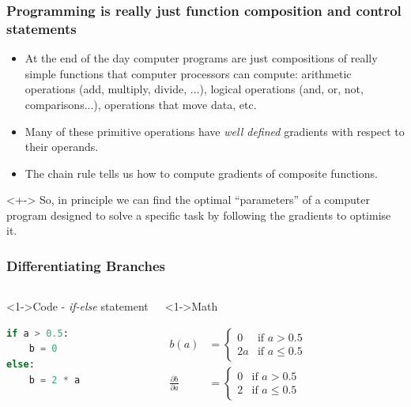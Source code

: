 \documentclass[]{article}
\begin{document}
\begin{frame}
\frametitle{Programming is really just function composition and control statements}

\begin{itemize}
	\item<+-> At the end of the day computer programs are just compositions of really simple functions that computer processors can compute: arithmetic operations (add, multiply, divide, ...), logical operations (and, or, not, comparisons...), operations that move data, etc.
	\item<+-> Many of these primitive operations have \emph{well defined} gradients with respect to their operands.
	\item<+-> The chain rule tells us how to compute gradients of composite functions.
\end{itemize}

\begin{block}<+->{}
So, in principle we can find the optimal ``parameters'' of a computer program designed to solve a specific task by following the gradients to optimise it.
\end{block}

    
\end{frame}

\begin{frame}[fragile]
\frametitle{Differentiating Branches}

\begin{columns}
    \begin{block}<1->{Code - \emph{if-else} statement}
    \begin{minipage}[c][2.5cm][c]{\linewidth}\begin{lstlisting}[language=python]
if a > 0.5:
    b = 0
else:
    b = 2 * a
\end{lstlisting}
	\end{minipage}
    \end{block}

	\begin{block}<1->{Math}
	\begin{minipage}[c][2.5cm][c]{\linewidth}\vspace{-0.5cm}%
	\begin{align*}
	b(a) &= \begin{cases} 0 & \text{if } a > 0.5 \\ 2 a & \text{if } a \leq 0.5 \end{cases} \\ 
	\frac{\partial b}{\partial a} &= \begin{cases} 0 & \text{if } a > 0.5 \\ 2 & \text{if } a \leq 0.5 \end{cases} 
	\end{align*}
   \end{minipage}
	\end{block}
\end{columns}
\end{frame}
\end{document}
